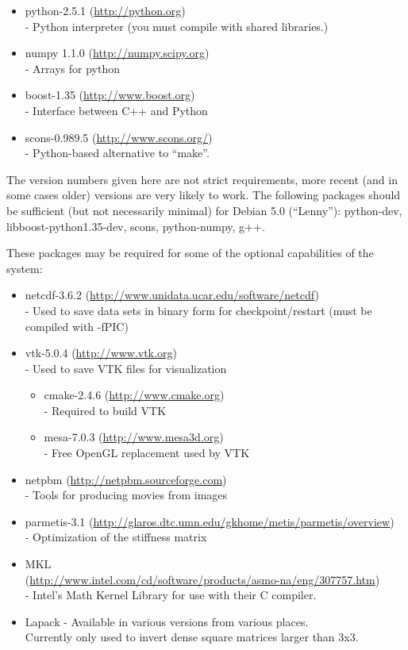 \begin{itemize}
 \item python-2.5.1 (\url{http://python.org}) \\-
        Python interpreter (you must compile with shared libraries.)
 \item numpy 1.1.0 (\url{http://numpy.scipy.org}) \\-
        Arrays for python
 \item boost-1.35 (\url{http://www.boost.org}) \\-
        Interface between C++ and Python
 \item scons-0.989.5 (\url{http://www.scons.org/}) \\-
        Python-based alternative to ``make''.
\end{itemize}

The version numbers given here are not strict requirements, more recent (and in some cases older) versions are very likely to work.
The following packages should be sufficient (but not necessarily minimal) for Debian 5.0 (``Lenny''):
python-dev, libboost-python1.35-dev, scons, python-numpy, g++.

These packages may be required for some of the optional capabilities of the system:

\begin{itemize}
 \item netcdf-3.6.2 (\url{http://www.unidata.ucar.edu/software/netcdf}) \\-
        Used to save data sets in binary form for checkpoint/restart (must be compiled with -fPIC)
 \item vtk-5.0.4 (\url{http://www.vtk.org}) \\-
        Used to save VTK files for visualization
  \begin{itemize}
   \item cmake-2.4.6 (\url{http://www.cmake.org}) \\-
        Required to build VTK
   \item mesa-7.0.3 (\url{http://www.mesa3d.org})\\-
        Free OpenGL replacement used by VTK
  \end{itemize}
 \item netpbm (\url{http://netpbm.sourceforge.com}) \\-
        Tools for producing movies from images
 \item parmetis-3.1 (\url{http://glaros.dtc.umn.edu/gkhome/metis/parmetis/overview}) \\-
        Optimization of the stiffness matrix
 \item MKL \\(\url{http://www.intel.com/cd/software/products/asmo-na/eng/307757.htm}) \\-
        Intel's Math Kernel Library for use with their C compiler.
\item Lapack - Available in various versions from various places. \\ 
Currently only used to invert dense square matrices larger than 3x3. 
\end{itemize}

